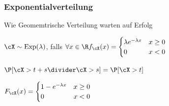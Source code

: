 \subsubsection{Exponentialverteilung}
{\scriptsize Wie Geomemtrische Verteilung warten auf Erfolg}

\shortdefinition $\cX \sim \text{Exp}(\lambda)$, falls
$\forall x \in \R f_\cX(x) = \begin{cases}
        \lambda e^{-\lambda x} & x \geq 0 \\
        0                      & x < 0
    \end{cases}$

\shortremark[Gedächtnisl.] $\P[\cX > t + s \divider \cX > s] = \P[\cX > t]$

\shortremark[Verteilungsfunktion] $F_\cX(x) = \begin{cases}
    1 - e^{-\lambda x} & x \geq 0 \\
    0                  & x < 0
\end{cases}$
